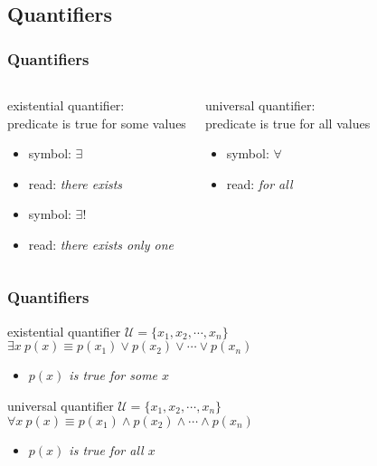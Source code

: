 \documentclass[dvipsnames]{beamer}
\begin{document}
\subsection{Quantifiers}

\begin{frame}
  \frametitle{Quantifiers}

  \begin{columns}[t]
    \begin{definition}
      \alert{existential quantifier}:\\
        predicate is true for some values

      \begin{itemize}
        \item symbol: $\exists$
        \item read: \emph{there exists}

        \pause
        \medskip
        \item symbol: $\exists!$
        \item read: \emph{there exists only one}
      \end{itemize}
    \end{definition}

    \pause
    \begin{definition}
      \alert{universal quantifier}:\\
        predicate is true for all values

      \begin{itemize}
        \item symbol: $\forall$
        \item read: \emph{for all}
      \end{itemize}
    \end{definition}
  \end{columns}
\end{frame}

\begin{frame}
  \frametitle{Quantifiers}

  \begin{block}{existential quantifier}
    $\mathcal{U} = \{x_1,x_2,\cdots,x_n\}$\\
    $\exists x~p(x) \equiv p(x_1) \vee p(x_2) \vee \cdots \vee p(x_n)$

    \begin{itemize}
      \item \emph{$p(x)$ is true for some $x$}
    \end{itemize}
  \end{block}

  \pause
  \begin{block}{universal quantifier}
    $\mathcal{U} = \{x_1,x_2,\cdots,x_n\}$\\
    $\forall x~p(x) \equiv p(x_1) \wedge p(x_2) \wedge \cdots \wedge p(x_n)$

    \begin{itemize}
      \item \emph{$p(x)$ is true for all $x$}
    \end{itemize}
  \end{block}
\end{frame}
\end{document}
